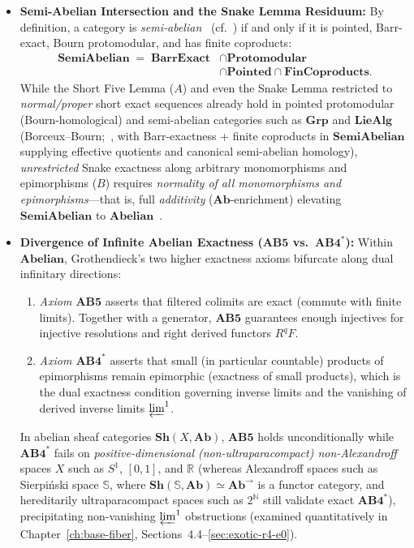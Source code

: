 \begin{itemize}
  \item \textbf{Semi-Abelian Intersection and the Snake Lemma Residuum:} By definition, a category is \emph{semi-abelian}~\cite{JMT02,Bourn91} (cf.~\cite[\S\S A1.3--A1.4]{Johnstone02}) if and only if it is pointed, Barr-exact, Bourn protomodular, and has finite coproducts:
  \[
    \begin{aligned}
      \mathbf{SemiAbelian} \;=\; \mathbf{BarrExact} &\cap \mathbf{Protomodular} \\
      &\cap \mathbf{Pointed} \cap \mathbf{FinCoproducts}.
    \end{aligned}
  \]
  While the Short Five Lemma ($A$) and even the Snake Lemma restricted to \emph{normal/proper} short exact sequences already hold in pointed protomodular (Bourn-homological) and semi-abelian categories such as $\mathbf{Grp}$ and $\mathbf{LieAlg}$ (Borceux--Bourn;~\cite{Bourn91,JMT02}, with Barr-exactness + finite coproducts in $\mathbf{SemiAbelian}$ supplying effective quotients and canonical semi-abelian homology), \emph{unrestricted} Snake exactness along arbitrary monomorphisms and epimorphisms ($B$) requires \emph{normality of all monomorphisms and epimorphisms}---that is, full \emph{additivity} ($\mathbf{Ab}$-enrichment) elevating $\mathbf{SemiAbelian}$ to $\mathbf{Abelian}$~\cite[Ch.~VIII]{MacLane98}.

  \item \textbf{Divergence of Infinite Abelian Exactness ($\mathbf{AB5}$ vs.\ $\mathbf{AB4}^*$):} Within $\mathbf{Abelian}$, Grothendieck's two higher exactness axioms bifurcate along dual infinitary directions:
  \begin{enumerate}
    \item \emph{Axiom $\mathbf{AB5}$} asserts that filtered colimits are exact (commute with finite limits). Together with a generator, $\mathbf{AB5}$ guarantees enough injectives for injective resolutions and right derived functors $R^q F$.
    \item \emph{Axiom $\mathbf{AB4}^*$} asserts that small (in particular countable) products of epimorphisms remain epimorphic (exactness of small products), which is the dual exactness condition governing inverse limits and the vanishing of derived inverse limits $\varprojlim^1$.
  \end{enumerate}
  In abelian sheaf categories $\mathbf{Sh}(X, \mathbf{Ab})$, $\mathbf{AB5}$ holds unconditionally while $\mathbf{AB4}^*$ fails on \emph{positive-dimensional (non-ultraparacompact) non-Alexandroff} spaces $X$ such as $S^1$, $[0, 1]$, and $\mathbb{R}$ (whereas Alexandroff spaces such as Sierpi\'nski space $\mathbb{S}$, where $\mathbf{Sh}(\mathbb{S}, \mathbf{Ab}) \simeq \mathbf{Ab}^{\to}$ is a functor category, and hereditarily ultraparacompact spaces such as $2^{\mathbb{N}}$ still validate exact $\mathbf{AB4}^*$), precipitating non-vanishing $\varprojlim^1$ obstructions (examined quantitatively in Chapter~\ref{ch:base-fiber}, Sections~4.4--\ref{sec:exotic-r4-e0}).

\end{itemize}

